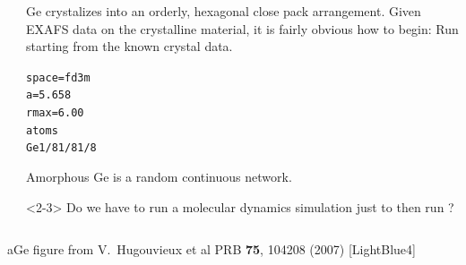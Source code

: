 \documentclass[10pt, xcolor=x11names, compress]{beamer}
\begin{document}
\begin{frame}[fragile]
\begin{columns}
\begin{column}{0.30\linewidth}
    \end{column}
    \begin{column}{0.7\linewidth}
      Ge crystalizes into an orderly, hexagonal close pack
      arrangement.  Given EXAFS data on the crystalline material, it
      is fairly obvious how to begin: Run {\feff} starting from the
      known crystal data.
      \begin{center}
        \begin{minipage}{0.5\linewidth}
\begin{alltt}
\scriptsize
{\color{SteelBlue2}space} = f d 3 m
{\color{Purple2}a}     = 5.658
{\color{Purple2}rmax}  = 6.00
{\color{Brown4}atoms}
  Ge   1/8   1/8   1/8
\end{alltt}
        \end{minipage}
      \end{center}
      Amorphous Ge is a random continuous network.  

      \medskip

      \begin{alertblock}<2-3>{}
        Do we have to run a molecular dynamics simulation just to
        then run {\feff}?

        \smallskip

      \end{alertblock}
    \end{column}
  \end{columns}

  \begin{bottomnote}[0.5][19.25]
    aGe figure from
    V.\ Hugouvieux et al PRB \textbf{75}, 104208 (2007)
    [LightBlue4]
  \end{bottomnote}
  
\end{frame}
\end{document}
